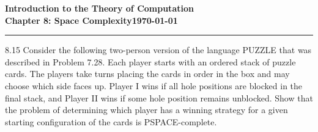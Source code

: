 \documentclass[11pt]{article}
\newcommand{\dated}{\today}
\begin{document}
\textbf{Introduction to the Theory of
Computation}\hfill\textbf{\myname}\\[0.01in]
\textbf{Chapter 8: Space Complexity}\hfill\textbf{\dated}\\
\smallskip\hrule\bigskip

\begin{problem}{8.15}
Consider the following two-person version of the language PUZZLE that was described in Problem 7.28. Each player starts with an ordered stack of puzzle cards. The players take turns placing the cards in order in the box and may choose which side faces up. Player I wins if all hole positions are blocked in the final stack, and Player II wins if some hole position remains unblocked. Show that the problem of determining which player has a winning strategy for a given starting configuration of the cards is PSPACE-complete.
\end{problem}
\end{document}
